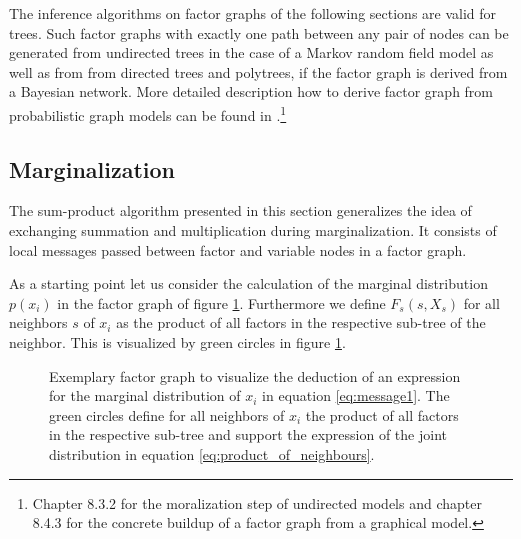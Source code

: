 \documentclass{sigkdd}
\begin{document}
The inference algorithms on factor graphs of the following sections are valid for trees. Such factor graphs with exactly one path between any pair of nodes can be generated from undirected trees in the case of a Markov random field model as well as from from directed trees and polytrees, if the factor graph is derived from a Bayesian network. More detailed description how to derive factor graph from probabilistic graph models can be found in \cite{bishop2006prml}.\footnote{Chapter 8.3.2 for the moralization step of undirected models and chapter 8.4.3 for the concrete buildup of a factor graph from a graphical model.}



\subsection{Marginalization}
The sum-product algorithm presented in this section generalizes the idea of exchanging summation and multiplication during marginalization. It consists of local messages passed between factor and variable nodes in a factor graph.

As a starting point let us consider the calculation of the marginal distribution $p(x_i)$ in the factor graph of figure \ref{fig:message1}. Furthermore we define $F_s(s, X_s)$ for all neighbors $s$ of $x_i$ as the product of all factors in the respective sub-tree of the neighbor. This is visualized by green circles in figure \ref{fig:message1}.
\begin{figure}[h]
	\centering
	\caption{Exemplary factor graph to visualize the deduction of an expression for the marginal distribution of $x_i$ in equation \ref{eq:message1}. The green circles define for all neighbors of $x_i$ the product of all factors in the respective sub-tree and support the expression of the joint distribution in equation \ref{eq:product_of_neighbours}.}\label{fig:message1}
\end{figure}
\end{document}
